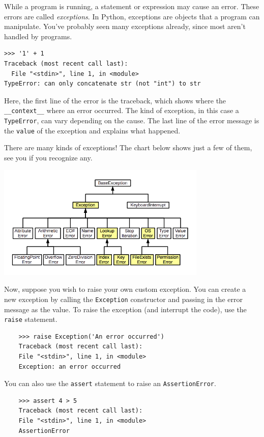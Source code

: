 While a program is running, a statement or expression may cause an error.
These errors are called \textit{exceptions}. In Python, exceptions are objects that a program can manipulate.
You've probably seen many exceptions already, since most aren't handled by programs.
\vspace{0.5mm}
\begin{lstlisting}
>>> '1' + 1
Traceback (most recent call last):
  File "<stdin>", line 1, in <module>
TypeError: can only concatenate str (not "int") to str
\end{lstlisting}
Here, the first line of the error is the traceback, which shows where the \lstinline{__context__} where an error occurred.
The kind of exception, in this case a  \lstinline{TypeError}, can vary depending on the cause.
The last line of the error message is the \lstinline{value} of the exception and explains what happened.


There are many kinds of exceptions! The chart below shows just a few of them, see you if you recognize any.


\includegraphics[width=10cm]{exceptions-hierarchy.png}

Now, suppose you wish to raise your own custom exception.
You can create a new exception by calling the \lstinline{Exception} constructor and passing in the error message as the value.  
To raise the exception (and interrupt the code), use the \lstinline{raise} statement.
\begin{lstlisting}
    >>> raise Exception('An error occurred')
    Traceback (most recent call last):
    File "<stdin>", line 1, in <module>
    Exception: an error occurred
\end{lstlisting}

You can also use the \lstinline{assert} statement to raise an \lstinline{AssertionError}.
\begin{lstlisting}
    >>> assert 4 > 5
    Traceback (most recent call last):
    File "<stdin>", line 1, in <module>
    AssertionError
\end{lstlisting}

